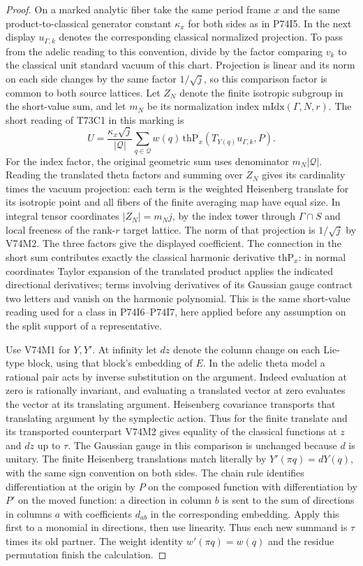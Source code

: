 \begin{proof}
On a marked analytic fiber take the same period frame $x$ and
the same product-to-classical generator constant $\kappa_x$ for
both sides as in P74I5. In the next display $u_{\Gamma,k}$ denotes
the corresponding classical normalized projection. To pass from the
adelic reading to this convention, divide by the factor comparing
$v_k$ to the classical unit standard vacuum of this chart. Projection
is linear and its norm on each side changes by the same factor
$1/\sqrt j$, so this comparison factor is common to both source
lattices. Let $Z_N$ denote the finite isotropic
subgroup in the short-value sum, and let $m_N$ be its normalization
index $\mathrm{mIdx}(\Gamma,N,r)$. The short reading of T73C1
in this marking is
\[
 U=\frac{\kappa_x\sqrt{j}}{|\mathcal Q|}
      \sum_{q\in\mathcal Q} w(q)\,
          \mathrm{thP}_x(T_{Y(q)}u_{\Gamma,k},P).
\]
For the index factor, the original geometric sum uses denominator
$m_N|\mathcal Q|$. Reading the translated theta factors and summing
over $Z_N$ gives its cardinality times the vacuum projection: each
term is the weighted Heisenberg translate for its isotropic point
and all fibers of the finite averaging map have equal size. In
integral tensor coordinates $|Z_N|=m_N j$, by the index tower
through $\Gamma\cap S$ and local freeness of the rank-$r$ target
lattice. The norm of that projection is $1/\sqrt j$ by V74M2.
The three factors give the displayed coefficient. The connection in
the short sum contributes exactly the classical harmonic derivative
$\mathrm{thP}_x$: in normal coordinates Taylor expansion of the
translated product applies the indicated directional derivatives;
terms involving derivatives of its Gaussian gauge contract two
letters and vanish on the harmonic polynomial. This is the same
short-value reading used for a class in P74I6--P74I7, here applied
before any assumption on the split support of a representative.

Use V74M1 for $Y,Y'$. At infinity let $d z$ denote the column
change on each Lie-type block, using that block's embedding of $E$.
In the adelic theta model a rational pair acts by inverse
substitution on the argument. Indeed evaluation at zero is rationally
invariant, and evaluating a translated vector at zero evaluates
the vector at its translating argument. Heisenberg covariance
transports that translating argument by the symplectic action.
Thus for the finite translate and its transported counterpart
V74M2 gives equality of the classical functions at $z$ and $dz$
up to $\tau$. The Gaussian gauge in this comparison is unchanged
because $d$ is unitary. The finite Heisenberg translations match
literally by $Y'(\pi q)=dY(q)$, with the same sign convention on
both sides. The chain rule identifies differentiation at the origin
by $P$ on the composed function with differentiation by $P'$ on
the moved function: a direction in column $b$ is sent to the sum
of directions in columns $a$ with coefficients $d_{ab}$ in
the corresponding embedding. Apply this first to a monomial in
directions, then use linearity. Thus each new summand is $\tau$
times its old partner. The weight identity
$w'(\pi q)=w(q)$ and the residue permutation finish the calculation.


\end{proof}
